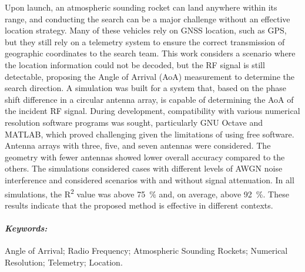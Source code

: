 Upon launch, an atmospheric sounding rocket can land anywhere within its range, and conducting the search can be a major challenge without an effective location strategy.
Many of these vehicles rely on \acs{GNSS} location, such as \acs{GPS}, but they still rely on a telemetry system to ensure the correct transmission of geographic coordinates to the search team.
This work considers a scenario where the location information could not be decoded, but the \acs{RF} signal is still detectable, proposing the Angle of Arrival (\acs{AoA}) measurement to determine the search direction.
A simulation was built for a system that, based on the phase shift difference in a circular antenna array, is capable of determining the \acs{AoA} of the incident \ac{RF} signal.
During development, compatibility with various numerical resolution software programs was sought, particularly GNU Octave and MATLAB, which proved challenging given the limitations of using free software.
Antenna arrays with three, five, and seven antennas were considered. The geometry with fewer antennas showed lower overall accuracy compared to the others.
The simulations considered cases with different levels of \acs{AWGN} noise interference and considered scenarios with and without signal attenuation.
In all simulations, the R\textsuperscript{2} value was above \qty{75}{\percent} and, on average, above \qty{92}{\percent}.
These results indicate that the proposed method is effective in different contexts.

\paragraph*{\textit{Keywords:}} Angle of Arrival; Radio Frequency; Atmospheric Sounding Rockets; Numerical Resolution; Telemetry; Location.
